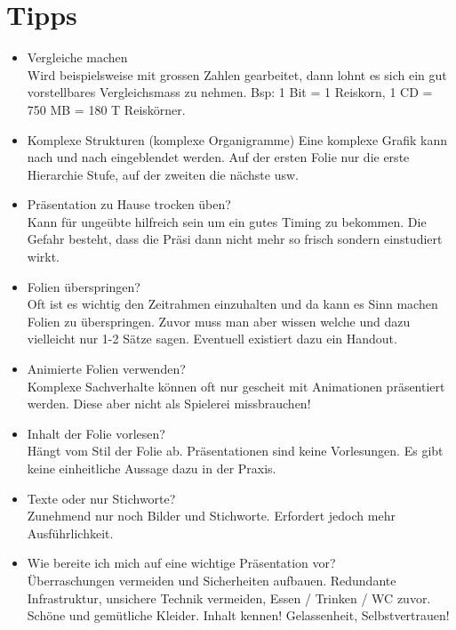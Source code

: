 \section{Tipps}
\begin{itemize}
	\item Vergleiche machen\\
	Wird beispielsweise mit grossen Zahlen gearbeitet, dann lohnt es sich ein gut vorstellbares Vergleichsmass zu nehmen. Bsp: 1 Bit = 1 Reiskorn, 1 CD = 750 MB = 180 T Reiskörner.
	\item Komplexe Strukturen (komplexe Organigramme)
	Eine komplexe Grafik kann nach und nach eingeblendet werden. Auf der ersten Folie nur die erste Hierarchie Stufe, auf der zweiten die nächste usw.
	\item Präsentation zu Hause trocken üben?\\
	Kann für ungeübte hilfreich sein um ein gutes Timing zu bekommen. Die Gefahr besteht, dass die Präsi dann nicht mehr so frisch sondern einstudiert wirkt.
	\item Folien überspringen?\\
	Oft ist es wichtig den Zeitrahmen einzuhalten und da kann es Sinn machen Folien zu überspringen. Zuvor muss man aber wissen welche und dazu vielleicht nur 1-2 Sätze sagen. Eventuell existiert dazu ein Handout.
	\item Animierte Folien verwenden?\\
	Komplexe Sachverhalte können oft nur gescheit mit Animationen präsentiert werden. Diese aber nicht als Spielerei missbrauchen!
	\item Inhalt der Folie vorlesen?\\
	Hängt vom Stil der Folie ab. Präsentationen sind keine Vorlesungen. Es gibt keine einheitliche Aussage dazu in der Praxis.
	\item Texte oder nur Stichworte?\\
	Zunehmend nur noch Bilder und Stichworte. Erfordert jedoch mehr Ausführlichkeit.
	\item Wie bereite ich mich auf eine wichtige Präsentation vor?\\
	Überraschungen vermeiden und Sicherheiten aufbauen. Redundante Infrastruktur, unsichere Technik vermeiden, Essen / Trinken / WC zuvor. Schöne und gemütliche Kleider. Inhalt kennen! Gelassenheit, Selbstvertrauen!
\end{itemize}

